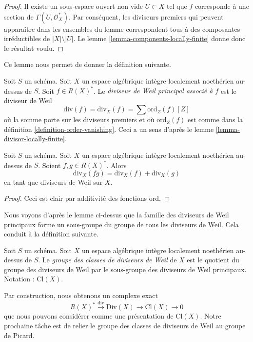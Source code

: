 \begin{proof}
Il existe un sous-espace ouvert non vide $U \subset X$
tel que $f$ corresponde à une section de $\Gamma(U, \mathcal{O}_X^*)$.
Par conséquent, les diviseurs premiers qui peuvent apparaître dans les ensembles du lemme
correspondent tous à des composantes irréductibles de $|X| \setminus |U|$.
Le lemme \ref{lemma-components-locally-finite} donne donc le résultat voulu.
\end{proof}

\noindent
Ce lemme nous permet de donner la définition suivante.

\begin{definition}
\label{definition-principal-divisor}
Soit $S$ un schéma.
Soit $X$ un espace algébrique intègre localement noethérien au-dessus de $S$.
Soit $f \in R(X)^*$.
Le {\it diviseur de Weil principal associé à $f$} est le diviseur de Weil
$$
\text{div}(f) = \text{div}_X(f) = \sum \text{ord}_Z(f) [Z]
$$
où la somme porte sur les diviseurs premiers et où $\text{ord}_Z(f)$ est comme dans
la définition \ref{definition-order-vanishing}. Ceci a un sens
d'après le lemme \ref{lemma-divisor-locally-finite}.
\end{definition}

\begin{lemma}
\label{lemma-div-additive}
Soit $S$ un schéma.
Soit $X$ un espace algébrique intègre localement noethérien au-dessus de $S$.
Soient $f, g \in R(X)^*$. Alors
$$
\text{div}_X(fg) = \text{div}_X(f) + \text{div}_X(g)
$$
en tant que diviseurs de Weil sur $X$.
\end{lemma}

\begin{proof}
Ceci est clair par additivité des fonctions $\text{ord}$.
\end{proof}

\noindent
Nous voyons d'après le lemme ci-dessus que la famille des diviseurs de Weil principaux
forme un sous-groupe du groupe de tous les diviseurs de Weil. Cela conduit à la
définition suivante.

\begin{definition}
\label{definition-class-group}
Soit $S$ un schéma.
Soit $X$ un espace algébrique intègre localement noethérien au-dessus de $S$. Le
{\it groupe des classes de diviseurs de Weil} de $X$ est le quotient du
groupe des diviseurs de Weil par le sous-groupe des diviseurs de Weil principaux.
Notation : $\text{Cl}(X)$.
\end{definition}

\noindent
Par construction, nous obtenons un complexe exact
\begin{equation}
\label{equation-Weil-divisor-class}
R(X)^* \xrightarrow{\text{div}} \text{Div}(X) \to \text{Cl}(X) \to 0
\end{equation}
que nous pouvons considérer comme une présentation de $\text{Cl}(X)$. Notre prochaine tâche
est de relier le groupe des classes de diviseurs de Weil au groupe de Picard.


